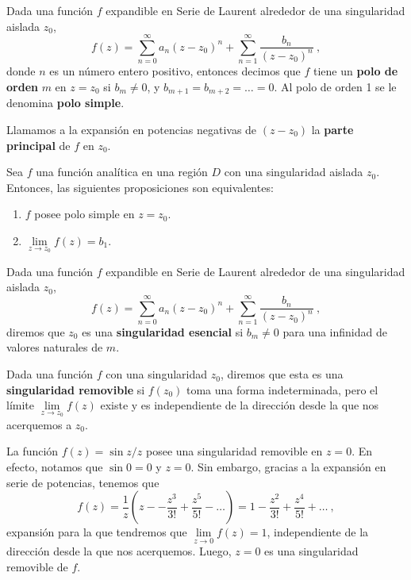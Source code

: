 \begin{defi}
    Dada una función $f$ expandible en Serie de Laurent alrededor de una singularidad aislada $z_0$, 
    \begin{equation}
        f(z) = \sum_{n=0}^\infty a_n(z-z_0)^n + \sum_{n=1}^\infty \frac{b_n}{(z-z_0)^n} \ ,
    \end{equation}
    donde $n$ es un número entero positivo, entonces decimos que $f$ tiene un \textbf{polo de orden} $m$ en $z=z_0$ si $b_m \neq 0$, y $b_{m+1} = b_{m+2} = \dots = 0$. Al polo de orden 1 se le denomina \textbf{polo simple}.

    Llamamos a la expansión en potencias negativas de $(z-z_0)$ la \textbf{parte principal} de $f$ en $z_0$.
\end{defi}

\begin{teorema}
    Sea $f$ una función analítica en una región $D$ con una singularidad aislada $z_0$. Entonces, las siguientes proposiciones son equivalentes:
    \begin{enumerate}
        \item $f$ posee polo simple en $z = z_0$.
        \item $\lim\limits_{z \to z_0} f(z) = b_1$.
    \end{enumerate}
\end{teorema}

\begin{defi}
    Dada una función $f$ expandible en Serie de Laurent alrededor de una singularidad aislada $z_0$, 
    \begin{equation}
        f(z) = \sum_{n=0}^\infty a_n(z-z_0)^n + \sum_{n=1}^\infty \frac{b_n}{(z-z_0)^n} \ ,
    \end{equation}
    diremos que $z_0$ es una \textbf{singularidad esencial} si $b_m \neq 0$ para una infinidad de valores naturales de $m$.
\end{defi}

\begin{defi}
    Dada una función $f$ con una singularidad $z_0$, diremos que esta es una \textbf{singularidad removible} si $f(z_0)$ toma una forma indeterminada, pero el límite $\lim\limits_{z \to z_0} f(z)$ existe y es independiente de la dirección desde la que nos acerquemos a $z_0$.
\end{defi}

\begin{ejemplo}
    La función $f(z) = \sin z/z$ posee una singularidad removible en $z=0$. En efecto, notamos que $\sin 0 = 0$ y $z = 0$. Sin embargo, gracias a la expansión en serie de potencias, tenemos que 
    \begin{equation*}
        f(z) = \frac{1}{z} \left( z - - \frac{z^3}{3!} + \frac{z^5}{5!} - \dots  \right) = 1 - \frac{z^2}{3!} + \frac{z^4}{5!} + \dots \ ,
    \end{equation*}
    expansión para la que tendremos que $\lim\limits_{z \to 0} f(z) = 1$, independiente de la dirección desde la que nos acerquemos. Luego, $z=0$ es una singularidad removible de $f$.
\end{ejemplo}

